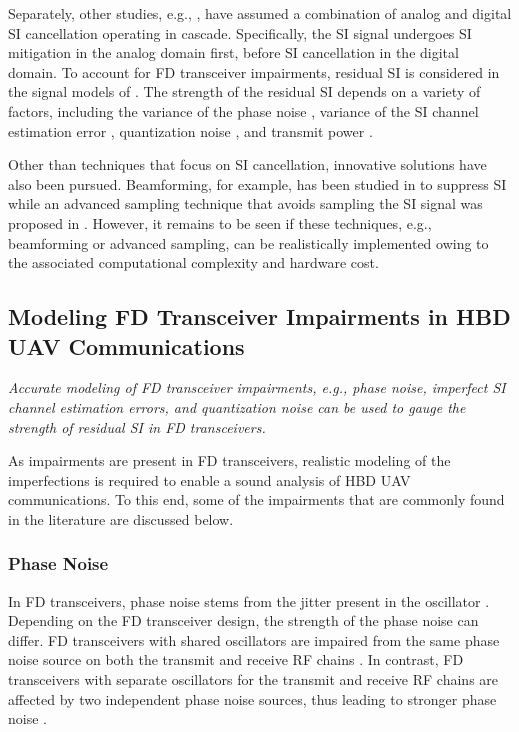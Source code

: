 Separately, other studies, e.g., \cite{ernest2019outage,tan2018joint,ernest2019power,sahai2013impact,ahmed2013rate,shende2018half}, have assumed a combination of analog and digital SI cancellation operating in cascade. Specifically, the SI signal undergoes SI mitigation in the analog domain first, before SI cancellation in the digital domain. To account for FD transceiver impairments, residual SI is considered in the signal models of \cite{ernest2019outage,tan2018joint,ernest2019power,sahai2013impact,ahmed2013rate,li2018self,shende2018half}. The strength of the residual SI depends on a variety of factors, including the variance of the phase noise \cite{ernest2019outage,tan2018joint,ernest2019power,sahai2013impact,ahmed2013rate,li2018self}, variance of the SI channel estimation error \cite{ernest2019outage,tan2018joint,ernest2019power,sahai2013impact,ahmed2013rate,zlatanov2017capacity}, quantization noise \cite{ahmed2013rate}, and transmit power \cite{shende2018half}.

Other than techniques that focus on SI cancellation, innovative solutions have also been pursued. Beamforming, for example, has been studied in \cite{hwang2017multi,chalise2017beamforming,mohammadi2018beamforming} to suppress SI while an advanced sampling technique that avoids sampling the SI signal was proposed in \cite{bernhardt2018self}. However, it remains to be seen if these techniques, e.g., beamforming or advanced sampling, can be realistically implemented owing to the associated computational complexity and hardware cost.

\subsection{Modeling FD Transceiver Impairments in HBD UAV Communications}
\begin{summary} \emph{
\emph{Accurate modeling of FD transceiver impairments, e.g., phase noise, imperfect SI channel estimation errors, and quantization noise can be used to gauge the strength of residual SI in FD transceivers.  
}}
\end{summary}
As impairments are present in FD transceivers, realistic modeling of the imperfections is required to enable a sound analysis of HBD UAV communications. To this end, some of the impairments that are commonly found in the literature are discussed below. 

\subsubsection{Phase Noise}
In FD transceivers, phase noise stems from the jitter present in the oscillator \cite{sahai2013impact}. Depending on the FD transceiver design, the strength of the phase noise can differ. FD transceivers with shared oscillators are impaired from the same phase noise source on both the transmit and receive RF chains \cite{li2018self,syrjala2014analysis}. In contrast, FD transceivers with separate oscillators for the transmit and receive RF chains are affected by two independent phase noise sources, thus leading to stronger phase noise \cite{li2018self}.

